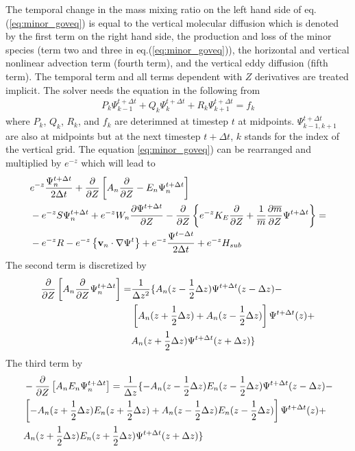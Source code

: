 The temporal change in the mass mixing ratio on the left hand side
of eq.(\ref{eq:minor_goveq}) is equal to the vertical molecular
diffusion which is denoted by the first term on the right hand side,
the production and loss of the minor species (term two and three in
eq.(\ref{eq:minor_goveq})), the horizontal and vertical nonlinear
advection term (fourth term), and the vertical eddy diffusion (fifth
term). The temporal term and all terms dependent with $Z$
derivatives are treated implicit. The solver needs the equation in
the following from
%
\begin{align}
  P_k\Psi_{k-1}^{t+\Delta t}+ Q_k\Psi_{k}^{t+\Delta t}+
   R_k\Psi_{k+1}^{t+\Delta t} = f_k \label{eq:minor_trisolver}
\end{align}
%
where $P_k$, $Q_k$, $R_k$, and $f_k$ are deterimned at timestep $t$ at
midpoints. $\Psi_{k-1,k+1}^{t+\Delta t}$ are also at midpoints but at the next
timestep $t+\Delta t$, $k$ stands for the index of the vertical grid. 
The equation \ref{eq:minor_goveq}) can be
rearranged and multiplied by $e^{-z}$ which will lead to
%
\begin{align}
  {}& e^{-z} \frac{\Psi_n^{t+\Delta t}}{2 \Delta t} + \frac{\partial}{\partial Z}
   \left[A_n  \frac{\partial}{\partial Z} - E_n \Psi_n^{t+\Delta
   t}\right] \notag \\
   {}& -e^{-z} S \Psi_n^{t+\Delta
   t}+ e^{-z} W_n \frac{\partial \Psi^{t+\Delta t}}{\partial
   Z} - \frac{\partial}{\partial Z} \left\{e^{-z} K_E  \frac{\partial}{\partial Z}+
   \frac{1}{\overline{m}}\frac{\partial\overline{m}}{\partial
   Z} \Psi^{t+\Delta t}\right\} = \notag \\
   {}& -e^{-z}R - e^{-z}\left\{ \mathbf{v}_n \cdot \nabla \Psi^{t}\right\}
   + e^{-z}\frac{\Psi^{t-\Delta t}}{2 \Delta t} + e^{-z} H_{sub}
\end{align}
%
The second term is discretized by
%
\begin{align}
  \frac{\partial}{\partial Z}\left[
   A_n \frac{\partial}{\partial Z} \Psi_n^{t+\Delta t} \right]= & \frac{1}{\Delta
   z^2}\{ A_n(z-\frac{1}{2}\Delta z) \Psi^{t+\Delta t}(z-\Delta z)
    - \notag \\
    {} & \left[ A_n(z+\frac{1}{2}\Delta z)+ A_n(z-\frac{1}{2}\Delta z)\right]
   \Psi^{t+\Delta t}(z) + \notag \\
   {} & A_n(z+\frac{1}{2}\Delta z) \Psi^{t+\Delta t}(z+\Delta z) \}
\end{align}
%
The third term by
%
\begin{align}
  {} &-\frac{\partial}{\partial Z}\left[
   A_n E_n \Psi_n^{t+\Delta t} \right]=   \frac{1}{\Delta
   z} \{- A_n(z-\frac{1}{2}\Delta z)E_n(z-\frac{1}{2}\Delta z) \Psi^{t+\Delta t}(z-\Delta z)
    - \notag \\
    {} & \left[ -A_n(z+\frac{1}{2}\Delta z)E_n(z+\frac{1}{2}\Delta z)+ A_n(z-\frac{1}{2}\Delta z)E_n(z-\frac{1}{2}\Delta z)\right]
   \Psi^{t+\Delta t}(z) + \notag \\
   {} & A_n(z+\frac{1}{2}\Delta z)E_n(z+\frac{1}{2}\Delta z) \Psi^{t+\Delta t}(z+\Delta z)
     \}
\end{align}
